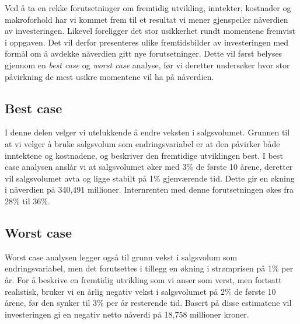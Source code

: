 Ved å ta en rekke forutsetninger om fremtidig utvikling, inntekter, kostnader og makroforhold har vi kommet frem til et resultat vi mener gjenspeiler nåverdien av investeringen. Likevel foreligger det stor usikkerhet rundt momentene fremvist i oppgaven. Det vil derfor presenteres ulike fremtidsbilder av investeringen med formål om å avdekke nåverdien gitt nye forutsetninger. Dette vil først belyses gjennom en \textit{best case} og \textit{worst case} analyse, før vi deretter undersøker hvor stor påvirkning de mest usikre momentene vil ha på nåverdien.

\subsection*{Best case}
I denne delen velger vi utelukkende å endre veksten i salgsvolumet. Grunnen til at vi velger å bruke salgsvolum som endringsvariabel er at den påvirker både inntektene og kostnadene, og beskriver den fremtidige utviklingen best. I best case analysen anslår vi at salgsvolumet øker med 3\% de første 10 årene, deretter vil salgsvolumet avta og ligge stabilt på 1\% gjenværende tid. Dette gir en økning i nåverdien på 340,491 millioner. Internrenten med denne forutsetningen økes fra 28\% til 36\%.

\subsection*{Worst case}
Worst case analysen legger også til grunn vekst i salgsvolum som endringsvariabel, men det forutsettes i tillegg en økning i strømprisen på 1\% per år. For å beskrive en fremtidig utvikling som vi anser som verst, men fortsatt realistisk, bruker vi en årlig negativ vekst i salgsvolumet på 2\% de første 10 årene, før den synker til 3\% per år resterende tid. Basert på disse estimatene vil investeringen gi en negativ netto nåverdi på 18,758 millioner kroner. 